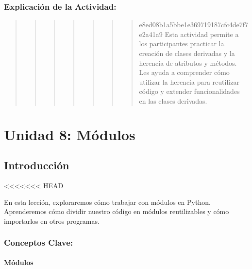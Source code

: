 \documentclass[
  a4paper,
  onepage,
  openany]{scrreprt}
\begin{document}
\hypertarget{explicaciuxf3n-de-la-actividad-55}{%
\section{Explicación de la
Actividad:}\label{explicaciuxf3n-de-la-actividad-55}}

\begin{quote}
\begin{quote}
\begin{quote}
\begin{quote}
\begin{quote}
\begin{quote}
\begin{quote}
e8ed08b1a5bbe1e369719187cfc4de7f7e2a41a9 Esta actividad permite a los
participantes practicar la creación de clases derivadas y la herencia de
atributos y métodos. Les ayuda a comprender cómo utilizar la herencia
para reutilizar código y extender funcionalidades en las clases
derivadas.
\end{quote}
\end{quote}
\end{quote}
\end{quote}
\end{quote}
\end{quote}
\end{quote}

\part{Unidad 8: Módulos}

\hypertarget{introducciuxf3n-1}{%
\chapter{Introducción}\label{introducciuxf3n-1}}

\textless\textless\textless\textless\textless\textless\textless{} HEAD

En esta lección, exploraremos cómo trabajar con módulos en Python.
Aprenderemos cómo dividir nuestro código en módulos reutilizables y cómo
importarlos en otros programas.

\hypertarget{conceptos-clave-58}{%
\section{Conceptos Clave:}\label{conceptos-clave-58}}

\hypertarget{muxf3dulos}{%
\subsection{Módulos}\label{muxf3dulos}}
\end{document}
